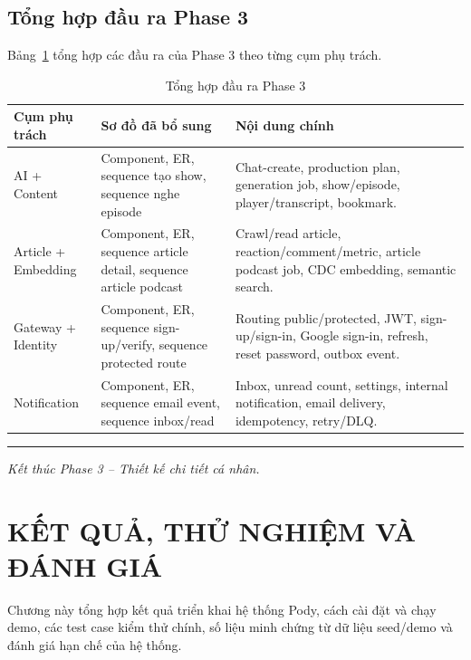 \documentclass[14pt,a4paper,oneside]{extreport}
\begin{document}
\section{Tổng hợp đầu ra Phase 3}
\label{sec:phase3-summary}

Bảng~\ref{tab:phase3-output} tổng hợp các đầu ra của Phase 3 theo từng cụm phụ trách.

\begin{table}[H]
\centering
\caption{Tổng hợp đầu ra Phase 3}
\label{tab:phase3-output}
\renewcommand{\arraystretch}{1.3}
\scriptsize
\begin{tabularx}{\textwidth}{|l|X|X|}
\hline
\textbf{Cụm phụ trách} & \textbf{Sơ đồ đã bổ sung} & \textbf{Nội dung chính} \\
\hline
AI + Content & Component, ER, sequence tạo show, sequence nghe episode & Chat-create, production plan, generation job, show/episode, player/transcript, bookmark. \\
\hline
Article + Embedding & Component, ER, sequence article detail, sequence article podcast & Crawl/read article, reaction/comment/metric, article podcast job, CDC embedding, semantic search. \\
\hline
Gateway + Identity & Component, ER, sequence sign-up/verify, sequence protected route & Routing public/protected, JWT, sign-up/sign-in, Google sign-in, refresh, reset password, outbox event. \\
\hline
Notification & Component, ER, sequence email event, sequence inbox/read & Inbox, unread count, settings, internal notification, email delivery, idempotency, retry/DLQ. \\
\hline
\end{tabularx}
\end{table}

\vspace{1cm}
\noindent\rule{\textwidth}{0.4pt}

\noindent
\textit{Kết thúc Phase 3 -- Thiết kế chi tiết cá nhân.}

\clearpage

\chapter{KẾT QUẢ, THỬ NGHIỆM VÀ ĐÁNH GIÁ}
\label{chap:ket-qua}

Chương này tổng hợp kết quả triển khai hệ thống Pody, cách cài đặt và chạy demo, các test case kiểm thử chính, số liệu minh chứng từ dữ liệu seed/demo và đánh giá hạn chế của hệ thống.
\end{document}
